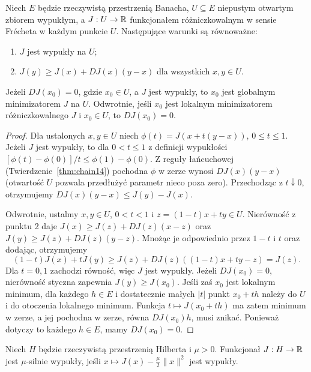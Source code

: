 \begin{twierdzenie}
\label{thm:convex-derivative16}
Niech $E$ będzie rzeczywistą przestrzenią Banacha,
$U\subseteq E$ niepustym otwartym zbiorem wypukłym, a
$J:U\to\mathbb R$ funkcjonałem różniczkowalnym w sensie
Frécheta w każdym punkcie $U$.
Następujące warunki są równoważne:
\begin{enumerate}
\item $J$ jest wypukły na $U$;
\item $J(y)\ge J(x)+DJ(x)(y-x)$ dla wszystkich $x,y\in U$.
\end{enumerate}
Jeżeli $DJ(x_0)=0$, gdzie $x_0\in U$, a $J$ jest wypukły,
to $x_0$ jest globalnym minimizatorem $J$ na $U$.
Odwrotnie, jeśli $x_0$ jest lokalnym minimizatorem
różniczkowalnego $J$ i $x_0\in U$, to $DJ(x_0)=0$.
\end{twierdzenie}
\begin{proof}
Dla ustalonych $x,y\in U$ niech
$\phi(t)=J(x+t(y-x))$, $0\le t\le1$.
Jeżeli $J$ jest wypukły, to dla $0<t\le1$
z definicji wypukłości
$[\phi(t)-\phi(0)]/t\le\phi(1)-\phi(0)$.
Z reguły łańcuchowej (Twierdzenie~\ref{thm:chain14})
pochodna $\phi$ w zerze wynosi $DJ(x)(y-x)$
(otwartość $U$ pozwala przedłużyć parametr nieco poza zero).
Przechodząc z $t\downarrow0$, otrzymujemy
$DJ(x)(y-x)\le J(y)-J(x)$.

Odwrotnie, ustalmy $x,y\in U$, $0<t<1$ i
$z=(1-t)x+ty\in U$.
Nierówność z punktu 2 daje
$J(x)\ge J(z)+DJ(z)(x-z)$ oraz
$J(y)\ge J(z)+DJ(z)(y-z)$.
Mnożąc je odpowiednio przez $1-t$ i $t$ oraz dodając,
otrzymujemy
\[
 (1-t)J(x)+tJ(y)\ge J(z)+DJ(z)((1-t)x+ty-z)=J(z).
\]
Dla $t=0,1$ zachodzi równość, więc $J$ jest wypukły.
Jeżeli $DJ(x_0)=0$, nierówność styczna zapewnia
$J(y)\ge J(x_0)$. Jeśli zaś $x_0$ jest lokalnym minimum,
dla każdego $h\in E$ i dostatecznie małych $|t|$
punkt $x_0+th$ należy do $U$ i do otoczenia lokalnego
minimum. Funkcja $t\mapsto J(x_0+th)$ ma zatem
minimum w zerze, a jej pochodna w zerze, równa
$DJ(x_0)h$, musi znikać. Ponieważ dotyczy to
każdego $h\in E$, mamy $DJ(x_0)=0$.
\end{proof}

\begin{definicja}
\label{def:strong-convex16}
Niech $H$ będzie rzeczywistą przestrzenią Hilberta
i $\mu>0$. Funkcjonał $J:H\to\mathbb R$ jest
$\mu$-silnie wypukły, jeśli $x\mapsto J(x)-\frac\mu2\|x\|^2$
jest wypukły.
\end{definicja}


